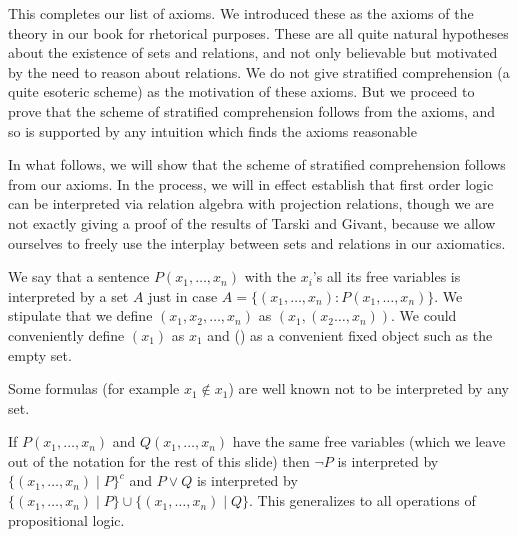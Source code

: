 \documentclass{slides}
\begin{document}
\begin{slide}

This completes our list of axioms.   We introduced these as the axioms of the theory in our book for rhetorical purposes.  These are all quite natural hypotheses about the existence of sets and relations, and not only believable but motivated by the need to reason about relations.  We do not give stratified comprehension (a quite esoteric scheme) as the motivation of these axioms.  But we proceed to prove that the scheme of stratified comprehension follows from the axioms, and so is supported by any intuition which finds the axioms reasonable

\end{slide}

\begin{slide}

In what follows, we will show that the scheme of stratified comprehension follows from our axioms.  In the process,
we will in effect establish that first order logic can be interpreted via relation algebra with projection relations, though we are not exactly giving a proof of the results of Tarski and Givant, because we allow ourselves to freely use the interplay between sets and relations in our axiomatics.

\end{slide}

\begin{slide}

We say that a sentence $P(x_1,\ldots,x_n)$ with the $x_i$'s all its free variables is interpreted by a set
$A$ just in case $A=\{(x_1,\ldots,x_n):P(x_1,\ldots,x_n)\}$.  We stipulate that we define $(x_1,x_2,\ldots,x_n)$
as $(x_1,(x_2\ldots,x_n))$.  We could conveniently define $(x_1)$ as $x_1$ and () as a convenient fixed object such as the empty set.

Some formulas (for example $x_1 \not\in x_1$) are well known not to be interpreted by any set.

\end{slide}

\begin{slide}

If $P(x_1,\ldots,x_n)$ and $Q(x_1,\ldots,x_n)$ have the same free variables (which we leave out of the notation for the rest of this slide)  then $\neg P$ is interpreted by $\{(x_1,\ldots,x_n)\mid P\}^c$ and $P \vee Q$ is interpreted
by $\{(x_1,\ldots,x_n)\mid P\} \cup \{(x_1,\ldots,x_n)\mid Q\}$.  This generalizes to all operations of propositional logic.

\end{slide}
\end{document}

